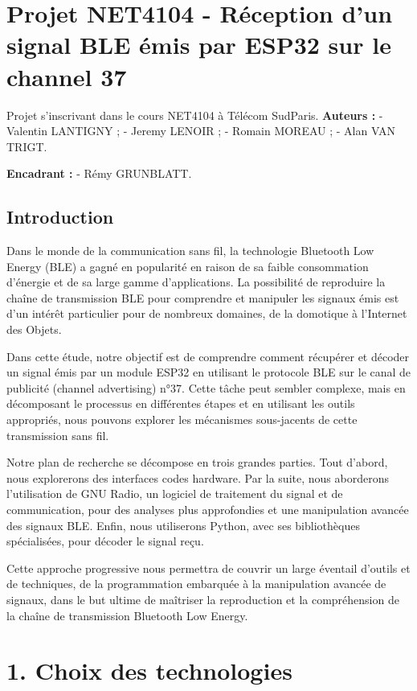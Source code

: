 \section{Projet NET4104 - Réception d'un signal BLE émis par ESP32 sur
le channel
37}\label{projet-net4104---ruxe9ception-dun-signal-ble-uxe9mis-par-esp32-sur-le-channel-37}

Projet s'inscrivant dans le cours NET4104 à Télécom SudParis.
\textbf{Auteurs :} - Valentin LANTIGNY ; - Jeremy LENOIR ; - Romain
MOREAU ; - Alan VAN TRIGT.

\textbf{Encadrant :} - Rémy GRUNBLATT.

\subsection{Introduction}\label{introduction}

Dans le monde de la communication sans fil, la technologie Bluetooth Low
Energy (BLE) a gagné en popularité en raison de sa faible consommation
d'énergie et de sa large gamme d'applications. La possibilité de
reproduire la chaîne de transmission BLE pour comprendre et manipuler
les signaux émis est d'un intérêt particulier pour de nombreux domaines,
de la domotique à l'Internet des Objets.

Dans cette étude, notre objectif est de comprendre comment récupérer et
décoder un signal émis par un module ESP32 en utilisant le protocole BLE
sur le canal de publicité (channel advertising) n°37. Cette tâche peut
sembler complexe, mais en décomposant le processus en différentes étapes
et en utilisant les outils appropriés, nous pouvons explorer les
mécanismes sous-jacents de cette transmission sans fil.

Notre plan de recherche se décompose en trois grandes parties. Tout
d'abord, nous explorerons des interfaces codes hardware. Par la suite,
nous aborderons l'utilisation de GNU Radio, un logiciel de traitement du
signal et de communication, pour des analyses plus approfondies et une
manipulation avancée des signaux BLE. Enfin, nous utiliserons Python,
avec ses bibliothèques spécialisées, pour décoder le signal reçu.

Cette approche progressive nous permettra de couvrir un large éventail
d'outils et de techniques, de la programmation embarquée à la
manipulation avancée de signaux, dans le but ultime de maîtriser la
reproduction et la compréhension de la chaîne de transmission Bluetooth
Low Energy.

\section{1. Choix des technologies}\label{choix-des-technologies}

